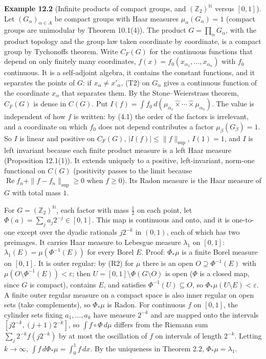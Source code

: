 \documentclass[
  english,
  11pt,
  a4paper,
]{article}
\begin{document}
\textbf{Example 12.2} (Infinite products of compact groups, and
\((\mathbb Z_2)^{\mathbb N}\) versus \([0,1]\)). Let
\((G_\alpha)_{\alpha\in A}\) be compact groups with Haar measures
\(\mu_\alpha(G_\alpha)=1\) (compact groups are unimodular by Theorem
10.1(4)). The product \(G=\prod_\alpha G_\alpha\), with the product
topology and the group law taken coordinate by coordinate, is a compact
group by Tychonoff\textquotesingle s theorem. Write \(C_F(G)\) for the
continuous functions that depend on only finitely many coordinates,
\(f(x)=f_0(x_{\alpha_1},\dots,x_{\alpha_n})\) with \(f_0\) continuous.
It is a self-adjoint algebra, it contains the constant functions, and it
separates the points of \(G\): if \(x_\alpha\neq x'_\alpha\), (T2) on
\(G_\alpha\) gives a continuous function of the coordinate \(x_\alpha\)
that separates them. By the Stone--Weierstrass theorem, \(C_F(G)\) is
dense in \(C(G)\). Put
\(I(f)=\int f_0\,d(\mu_{\alpha_1}\hat\times\cdots\hat\times\mu_{\alpha_n})\).
The value is independent of how \(f\) is written: by (4.1) the order of
the factors is irrelevant, and a coordinate on which \(f_0\) does not
depend contributes a factor \(\mu_\beta(G_\beta)=1\). So \(I\) is linear
and positive on \(C_F(G)\), \(|I(f)|\leq\|f\|_{\sup}\), \(I(1)=1\), and
\(I\) is left invariant because each finite product measure is a left
Haar measure (Proposition 12.1(1)). It extends uniquely to a positive,
left-invariant, norm-one functional on \(C(G)\) (positivity passes to
the limit because \(\operatorname{Re}f_n+\|f-f_n\|_{\sup}\geq0\) when
\(f\geq0\)). Its Radon measure is the Haar measure of \(G\) with total
mass \(1\).

For \(G=(\mathbb Z_2)^{\mathbb N}\), each factor with mass \(\frac12\)
on each point, let \(\Phi(a)=\sum_ja_j2^{-j}\in[0,1]\). This map is
continuous and onto, and it is one-to-one except over the dyadic
rationals \(j2^{-k}\) in \((0,1)\), each of which has two preimages. It
carries Haar measure to Lebesgue measure \(\lambda_1\) on \([0,1]\):
\(\lambda_1(E)=\mu(\Phi^{-1}(E))\) for every Borel \(E\). Proof:
\(\Phi_*\mu\) is a finite Borel measure on \([0,1]\). It is outer
regular: by (R2) for \(\mu\) there is an open \(O\supseteq\Phi^{-1}(E)\)
with \(\mu(O\setminus\Phi^{-1}(E))<\varepsilon\); then
\(U=[0,1]\setminus\Phi(G\setminus O)\) is open (\(\Phi\) is a closed
map, since \(G\) is compact), contains \(E\), and satisfies
\(\Phi^{-1}(U)\subseteq O\), so \(\Phi_*\mu(U\setminus E)<\varepsilon\).
A finite outer regular measure on a compact space is also inner regular
on open sets (take complements), so \(\Phi_*\mu\) is Radon. For
continuous \(f\) on \([0,1]\), the cylinder sets fixing
\(a_1,\dots,a_k\) have measure \(2^{-k}\) and are mapped onto the
intervals \([j2^{-k},(j+1)2^{-k}]\), so \(\int f\circ\Phi\,d\mu\)
differs from the Riemann sum \(\sum_j2^{-k}f(j2^{-k})\) by at most the
oscillation of \(f\) on intervals of length \(2^{-k}\). Letting
\(k\to\infty\), \(\int f\,d\Phi_*\mu=\int_0^1f\,dx\). By the uniqueness
in Theorem 2.2, \(\Phi_*\mu=\lambda_1\).
\end{document}
